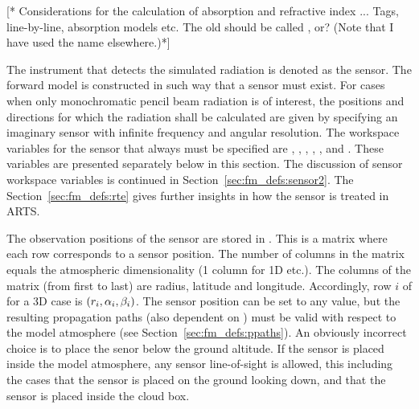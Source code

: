\label{sec:fm_defs:absorption}

[* Considerations for the calculation of absorption and refractive
index ...  Tags, line-by-line, absorption models etc. The old
 should be called , or? (Note that I
have used the name  elsewhere.)*]



\label{sec:fm_defs:sensor1}

The instrument that detects the simulated radiation is denoted as the
sensor. The forward model is constructed in such
way that a sensor must exist. For cases when only monochromatic
pencil beam radiation is of interest, the positions and directions for
which the radiation shall be calculated are given by specifying an
imaginary sensor with infinite frequency and angular resolution. The
workspace variables for the sensor that always must be specified are
, ,
, ,
,  and
. These variables are presented separately below in this
section. The discussion of sensor workspace variables is continued in
Section~\ref{sec:fm_defs:sensor2}. The Section~\ref{sec:fm_defs:rte}
gives further insights in how the sensor is treated in ARTS.


\label{sec:fm_defs:sensorpos}

The observation positions of the sensor are stored in
. This is a matrix where each row corresponds to
a sensor position. The number of columns in the matrix equals the
atmospheric dimensionality (1 column for 1D etc.). The columns of the
matrix (from first to last) are radius, latitude and longitude.
Accordingly, row $i$ of  for a 3D case is
$(r_{i},\alpha_{i},\beta_{i})$. The sensor position can be set to any
value, but the resulting propagation paths (also dependent on
) must be valid with respect to the model
atmosphere (see Section~\ref{sec:fm_defs:ppaths}). An obviously
incorrect choice is to place the senor below the ground altitude. If
the sensor is placed inside the model atmosphere, any sensor
line-of-sight is allowed, this including the cases that the sensor is
placed on the ground looking down, and that the sensor is placed
inside the cloud box.

